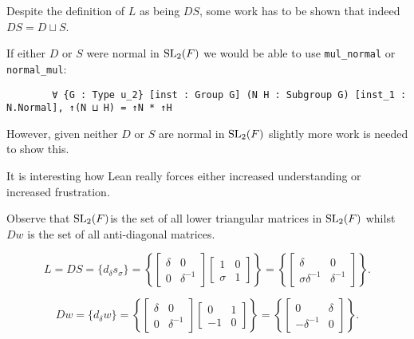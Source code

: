 \begin{remark}
    Despite the definition of $L$ as being $D S$, some work has to be shown that indeed $DS = D \sqcup S$.
    
    If either $D$ or $S$ were normal in $\operatorname{SL}_2(F)$ we would be able to use \texttt{mul\_normal} or \texttt{normal\_mul}:
    
    \begin{verbatim}
        ∀ {G : Type u_2} [inst : Group G] (N H : Subgroup G) [inst_1 : N.Normal], ↑(N ⊔ H) = ↑N * ↑H
    \end{verbatim}

    However, given neither $D$ or $S$ are normal in $\operatorname{SL}_2(F)$ slightly more work is needed to show this.
    
    It is interesting how Lean really forces either increased understanding or increased frustration.
\end{remark}

Observe that $\operatorname{SL}_2(F)$is the set of all lower triangular matrices in $\operatorname{SL}_2(F)$ whilst $Dw$ is the set of all anti-diagonal matrices.

\begin{equation} \label{Hlowertri} L = DS =  \{d_\delta s_\sigma\} = \left\{ \begin{bmatrix} \delta & 0 \\ 0 & \delta^{-1} \end{bmatrix} \begin{bmatrix} 1 & 0 \\ \sigma & 1 \end{bmatrix} \right\} = \left\{ \begin{bmatrix} \delta & 0 \\ \sigma \delta^{-1} & \delta^{-1} \end{bmatrix}  \right\}. \end{equation}

\begin{equation} \label{antidiag} Dw = \{ d_\delta w \} =  \left\{  \begin{bmatrix} \delta & 0 \\ 0 & \delta^{-1} \end{bmatrix} \begin{bmatrix} 0 & 1 \\ -1 & 0 \end{bmatrix} \right\} = \left\{ \begin{bmatrix} 0 & \delta \\ -\delta^{-1} & 0 \end{bmatrix}  \right\}. \end{equation}

